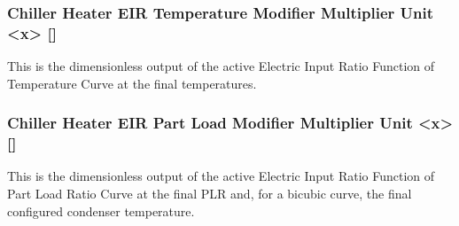 \subsubsection{Chiller Heater EIR Temperature Modifier Multiplier Unit \textless{}x\textgreater{} {[]}}\label{chiller-heater-eir-temperature-modifier-multiplier-unit-x}

This is the dimensionless output of the active Electric Input Ratio Function of Temperature Curve at the final temperatures.

\subsubsection{Chiller Heater EIR Part Load Modifier Multiplier Unit \textless{}x\textgreater{} {[]}}\label{chiller-heater-eir-part-load-modifier-multiplier-unit-x}

This is the dimensionless output of the active Electric Input Ratio Function of Part Load Ratio Curve at the final PLR and, for a bicubic curve, the final configured condenser temperature.
